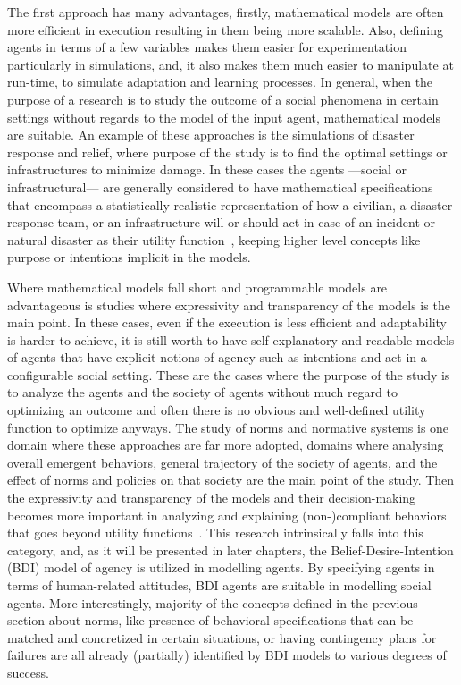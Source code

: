 The first approach has many advantages, firstly, mathematical models are often more efficient in execution resulting in them being more scalable. Also, defining agents in terms of a few variables makes them easier for experimentation particularly in simulations, and, it also makes them much easier to manipulate at run-time, to simulate adaptation and learning processes. In general, when the purpose of a research is to study the outcome of a social phenomena in certain settings without regards to the model of the input agent, mathematical models are suitable. An example of these approaches is the simulations of disaster response and relief, where purpose of the study is to find the optimal settings or infrastructures to minimize damage. In these cases the agents ---social or infrastructural--- are generally considered to have mathematical specifications that encompass a statistically realistic representation of how a civilian, a disaster response team, or an infrastructure will or should act in case of an incident or natural disaster as their utility function~\cite{arinta2019disaster,khouj2011disaster,chamola2021disaster}, keeping higher level concepts like purpose or intentions implicit in the models.


Where mathematical models fall short and programmable models are advantageous is studies where expressivity and transparency of the models is the main point. In these cases, even if the execution is less efficient and adaptability is harder to achieve, it is still worth to have self-explanatory and readable models of agents that have explicit notions of agency such as intentions and act in a configurable social setting. These are the cases where the purpose of the study is to analyze the agents and the society of agents without much regard to optimizing an outcome and often there is no obvious and well-defined utility function to optimize anyways. The study of norms and normative systems is one domain where these approaches are far more adopted, domains where analysing overall emergent behaviors, general trajectory of the society of agents, and the effect of norms and policies on that society are the main point of the study. Then the expressivity and transparency of the models and their decision-making becomes more important in analyzing and explaining (non-)compliant behaviors that goes beyond utility functions~\cite{van2019governmental}. This research intrinsically falls into this category, and, as it will be presented in later chapters, the Belief-Desire-Intention (BDI) model of agency \cite{Rao1995} is utilized in modelling agents. By specifying agents in terms of human-related attitudes, BDI agents are suitable in modelling social agents. More interestingly, majority of the concepts defined in the previous section about norms, like presence of behavioral specifications that can be matched and concretized in certain situations, or having contingency plans for failures are all already (partially) identified by BDI models to various degrees of success.


